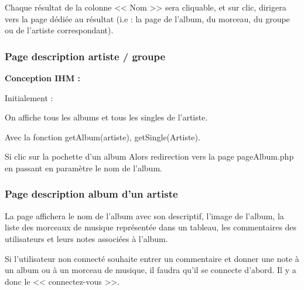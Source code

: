 
			\begin{paragraphe}
				Chaque résultat de la colonne << Nom >> sera cliquable, et sur clic, dirigera vers la page dédiée au résultat (i.e : la page de l'album, du morceau, du groupe ou de l'artiste correspondant).
			\end{paragraphe}

		\subsubsection{Page description artiste / groupe}

			\begin{paragraphe}
				\textbf{Conception IHM :}
			\end{paragraphe}

			\begin{paragraphe}
				Initialement :\par
				On affiche tous les albums et tous les singles de l'artiste.\par
				Avec la fonction getAlbum(artiste), getSingle(Artiste).
			\end{paragraphe}

			\begin{paragraphe}
				Si clic sur la pochette d'un album
				Alors redirection vers la page pageAlbum.php en passant en paramètre le nom de l'album.
			\end{paragraphe}


		\subsubsection{Page description album d'un artiste}

			\begin{paragraphe}
				La page affichera le nom de l'album avec son descriptif, l'image de l'album, la liste des morceaux de musique représentée dans un tableau, les commentaires des utilisateurs et leurs notes associées à l'album. \par
				Si l'utilisateur non connecté souhaite entrer un commentaire et donner une note à un album ou à un morceau de musique, il faudra qu'il se connecte d'abord. Il y a donc le << connectez-vous >>.
			\end{paragraphe}

